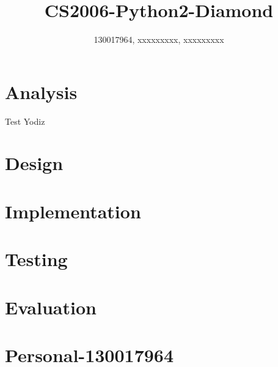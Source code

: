 \documentclass{article}
\title{CS2006-Python2-Diamond}
\author{130017964, xxxxxxxxx, xxxxxxxxx}
\begin{document}
\maketitle

\section{Analysis}
Test Yodiz
\section{Design}
\section{Implementation}
\section{Testing}
\section{Evaluation}
\section{Personal-130017964}
\end{document}
